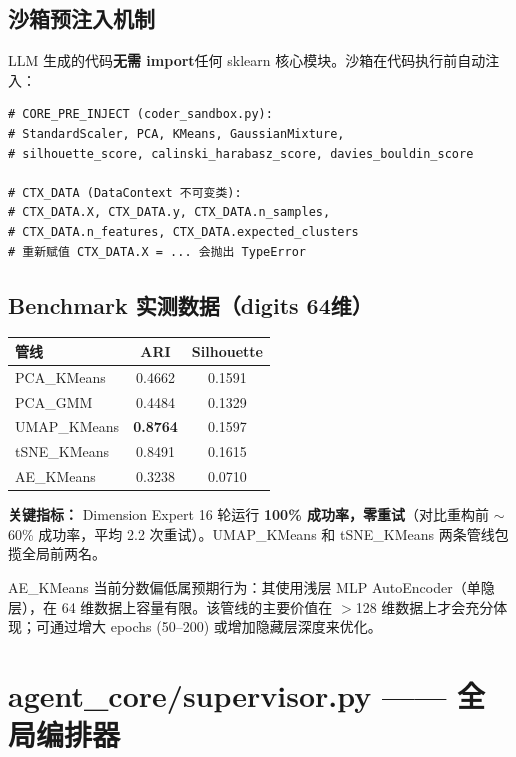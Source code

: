 \documentclass[11pt,a4paper]{ctexbook}
\begin{document}
\subsection{沙箱预注入机制}

LLM 生成的代码\textbf{无需 import}任何 sklearn 核心模块。沙箱在代码执行前自动注入：

\begin{verbatim}
# CORE_PRE_INJECT (coder_sandbox.py):
# StandardScaler, PCA, KMeans, GaussianMixture,
# silhouette_score, calinski_harabasz_score, davies_bouldin_score

# CTX_DATA (DataContext 不可变类):
# CTX_DATA.X, CTX_DATA.y, CTX_DATA.n_samples,
# CTX_DATA.n_features, CTX_DATA.expected_clusters
# 重新赋值 CTX_DATA.X = ... 会抛出 TypeError
\end{verbatim}

\subsection{Benchmark 实测数据（digits 64维）}

\begin{center}
\begin{tabular}{p{3cm} c c}
    \toprule
    \textbf{管线} & \textbf{ARI} & \textbf{Silhouette} \\
    \midrule
    PCA\_KMeans  & 0.4662 & 0.1591 \\
    PCA\_GMM     & 0.4484 & 0.1329 \\
    UMAP\_KMeans & \textbf{0.8764} & 0.1597 \\
    tSNE\_KMeans & 0.8491 & 0.1615 \\
    AE\_KMeans   & 0.3238 & 0.0710 \\
    \bottomrule
\end{tabular}
\end{center}

\textbf{关键指标：} Dimension Expert 16 轮运行 \textbf{100\% 成功率，零重试}（对比重构前 $\sim$60\% 成功率，平均 2.2 次重试）。UMAP\_KMeans 和 tSNE\_KMeans 两条管线包揽全局前两名。

\begin{tipbox}
    AE\_KMeans 当前分数偏低属预期行为：其使用浅层 MLP AutoEncoder（单隐层），在 64 维数据上容量有限。该管线的主要价值在 $>$128 维数据上才会充分体现；可通过增大 epochs (50–200) 或增加隐藏层深度来优化。
\end{tipbox}

\section{agent\_core/supervisor.py —— 全局编排器}
\end{document}
